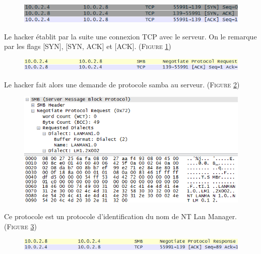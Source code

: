 \documentclass[11pt]{article}
\begin{document}
 \begin{figure}[hbtp]
        \centering \includegraphics[scale=0.4]{Exo3/3.png}
        \caption{}
         \label{fig:3}
\end{figure}

Le hacker établit par la suite une connexion TCP avec le serveur. On le remarque par les flags [SYN], [SYN, ACK] et [ACK]. (\textsc{Figure \ref{fig:3}})

 \begin{figure}[hbtp]
        \centering \includegraphics[scale=0.4]{Exo3/4.png}
        \caption{}
         \label{fig:4}
\end{figure}

Le hacker fait alors une demande de protocole samba au serveur. (\textsc{Figure \ref{fig:4}})

 \begin{figure}[hbtp]
        \centering \includegraphics[scale=0.4]{Exo3/5.png}
        \caption{}
         \label{fig:5}
\end{figure}

Ce protocole est un protocole d’identification du nom de NT Lan Manager. (\textsc{Figure \ref{fig:5}})

 \begin{figure}[hbtp]
        \centering \includegraphics[scale=0.4]{Exo3/6.png}
        \caption{}
         \label{fig:6}
\end{figure}
\end{document}
